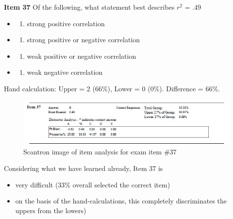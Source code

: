 \documentclass[
  english,
]{book}
\providecommand{\tightlist}{%
  \setlength{\itemsep}{0pt}\setlength{\parskip}{0pt}}
\begin{document}
\textbf{Item 37} Of the following, what statement best describes \(r^2\) = .49

\begin{itemize}
\item
  \begin{enumerate}
  \def\labelenumi{\alph{enumi})}
  \tightlist
  \item
    strong positive correlation
  \end{enumerate}
\item
  \begin{enumerate}
  \def\labelenumi{\alph{enumi})}
  \setcounter{enumi}{1}
  \tightlist
  \item
    strong positive or negative correlation
  \end{enumerate}
\item
  \begin{enumerate}
  \def\labelenumi{\alph{enumi})}
  \setcounter{enumi}{2}
  \tightlist
  \item
    weak positive or negative correlation
  \end{enumerate}
\item
  \begin{enumerate}
  \def\labelenumi{\alph{enumi})}
  \setcounter{enumi}{3}
  \tightlist
  \item
    weak negative correlation
  \end{enumerate}
\end{itemize}

Hand calculation: Upper = 2 (66\%), Lower = 0 (0\%). Difference = 66\%.

\begin{figure}
\centering
\includegraphics{images/ItemAnalExam/Item37.jpg}
\caption{Scantron image of item analysis for exam item \#37}
\end{figure}

Considering what we have learned already, Item 37 is

\begin{itemize}
\tightlist
\item
  very difficult (33\% overall selected the correct item)
\item
  on the basis of the hand-calculations, this completely discriminates the uppers from the lowers)
\end{itemize}
\end{document}

